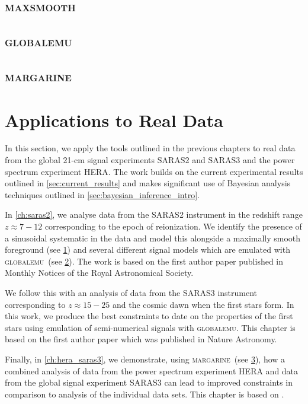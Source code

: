 \documentclass[a4paper,11pt,twoside,extrafontsizes,oldfontcommands]{memoir}
\newcommand{\name}{\textsc{globalemu}}
\begin{document}
\chapter{\textsc{maxsmooth}}
\label{ch:maxsmooth}



\chapter{\textsc{globalemu}}
\label{ch:globalemu}


\chapter{\textsc{margarine}}
\label{ch:margarine}


\part{Applications to Real Data}

In this section, we apply the tools outlined in the previous chapters to real data from the global 21-cm signal experiments SARAS2 and SARAS3 and the power spectrum experiment HERA. The work builds on the current experimental results outlined in \cref{sec:current_results} and makes significant use of Bayesian analysis techniques outlined in \cref{sec:bayesian_inference_intro}.

In \cref{ch:saras2}, we analyse data from the SARAS2 instrument in the redshift range $z\approx7-12$ corresponding to the epoch of reionization. We identify the presence of a sinusoidal systematic in the data and model this alongside a maximally smooth foreground (see \cref{ch:maxsmooth}) and several different signal models which are emulated with \name~(see \cref{ch:globalemu}). The work is based on the first author paper \cite{Bevins_SARAS2_2022} published in Monthly Notices of the Royal Astronomical Society.

We follow this with an analysis of data from the SARAS3 instrument corresponding to $z\approx 15-25$ and the cosmic dawn when the first stars form. In this work, we produce the best constraints to date on the properties of the first stars using emulation of semi-numerical signals with \name. This chapter is based on the first author paper \cite{Bevins_saras3_2022} which was published in Nature Astronomy.

Finally, in \cref{ch:hera_saras3}, we demonstrate, using \textsc{margarine}~(see \cref{ch:margarine}), how a combined analysis of data from the power spectrum experiment HERA and data from the global signal experiment SARAS3 can lead to improved constraints in comparison to analysis of the individual data sets. This chapter is based on \cite{Bevins_hera_saras3_2023}.
\end{document}
